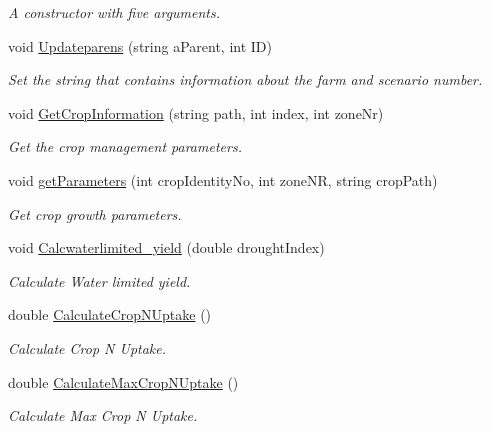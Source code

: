 \begin{DoxyCompactItemize}
\begin{DoxyCompactList}\small\item\em A constructor with five arguments. \end{DoxyCompactList}\item 
\mbox{\label{class_crop_class_ad8101a2f08818683b8da9bc39df05fa2}} 
void \mbox{\hyperlink{class_crop_class_ad8101a2f08818683b8da9bc39df05fa2}{Updateparens}} (string a\+Parent, int ID)
\begin{DoxyCompactList}\small\item\em Set the string that contains information about the farm and scenario number. \end{DoxyCompactList}\item 
void \mbox{\hyperlink{class_crop_class_aace04a8772eaabd16c1cc6f2eef90188}{Get\+Crop\+Information}} (string path, int index, int zone\+Nr)
\begin{DoxyCompactList}\small\item\em Get the crop management parameters. \end{DoxyCompactList}\item 
void \mbox{\hyperlink{class_crop_class_a86ee7fdf952a189ed79abd9a13a8d917}{get\+Parameters}} (int crop\+Identity\+No, int zone\+NR, string crop\+Path)
\begin{DoxyCompactList}\small\item\em Get crop growth parameters. \end{DoxyCompactList}\item 
void \mbox{\hyperlink{class_crop_class_a5cf7e8ffac0a2f538ea86d148a2cc5cc}{Calcwaterlimited\+\_\+yield}} (double drought\+Index)
\begin{DoxyCompactList}\small\item\em Calculate Water limited yield. \end{DoxyCompactList}\item 
double \mbox{\hyperlink{class_crop_class_ab78a04a1f616bdf6f29d772fe9913f4a}{Calculate\+Crop\+N\+Uptake}} ()
\begin{DoxyCompactList}\small\item\em Calculate Crop N Uptake. \end{DoxyCompactList}\item 
double \mbox{\hyperlink{class_crop_class_a44c1e27497731c59963ea6f3dce22d6d}{Calculate\+Max\+Crop\+N\+Uptake}} ()
\begin{DoxyCompactList}\small\item\em Calculate Max Crop N Uptake. \end{DoxyCompactList}\item 

\end{DoxyCompactItemize}
